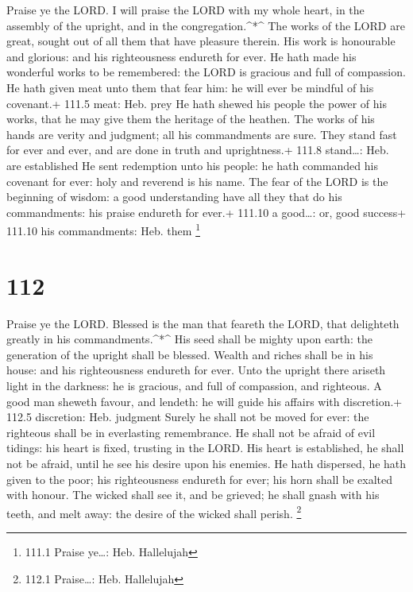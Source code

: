  Praise ye the LORD. I will praise the LORD with my whole
heart, in the assembly of the upright, and in the congregation.\^{}*\^{}
 The works of the LORD are great, sought out of all them
that have pleasure therein.  His work is honourable and
glorious: and his righteousness endureth for ever.  He hath
made his wonderful works to be remembered: the LORD is gracious and full
of compassion.  He hath given meat unto them that fear him:
he will ever be mindful of his covenant.+ 111.5 meat: Heb. prey
 He hath shewed his people the power of his works, that he
may give them the heritage of the heathen.  The works of his
hands are verity and judgment; all his commandments are sure.
 They stand fast for ever and ever, and are done in truth
and uprightness.+ 111.8 stand\ldots: Heb. are established 
He sent redemption unto his people: he hath commanded his covenant for
ever: holy and reverend is his name.  The fear of the LORD
is the beginning of wisdom: a good understanding have all they that do
his commandments: his praise endureth for ever.+ 111.10 a good\ldots:
or, good success+ 111.10 his commandments: Heb. them \footnote{111.1
  Praise ye\ldots: Heb. Hallelujah}

\hypertarget{section-111}{%
\section{112}\label{section-111}}

 Praise ye the LORD. Blessed is the man that feareth the
LORD, that delighteth greatly in his commandments.\^{}*\^{} 
His seed shall be mighty upon earth: the generation of the upright shall
be blessed.  Wealth and riches shall be in his house: and
his righteousness endureth for ever.  Unto the upright there
ariseth light in the darkness: he is gracious, and full of compassion,
and righteous.  A good man sheweth favour, and lendeth: he
will guide his affairs with discretion.+ 112.5 discretion: Heb. judgment
 Surely he shall not be moved for ever: the righteous shall
be in everlasting remembrance.  He shall not be afraid of
evil tidings: his heart is fixed, trusting in the LORD.  His
heart is established, he shall not be afraid, until he see his desire
upon his enemies.  He hath dispersed, he hath given to the
poor; his righteousness endureth for ever; his horn shall be exalted
with honour.  The wicked shall see it, and be grieved; he
shall gnash with his teeth, and melt away: the desire of the wicked
shall perish. \footnote{112.1 Praise\ldots: Heb. Hallelujah}

